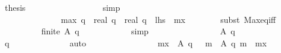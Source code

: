 \begin{isabellebody}
\ {\isacharquery}thesis\isanewline
\ \ \ \ \ \ \ \ \ \ \ \ \ \ \ \ \isamarkupfalse%
\ simp\isanewline
\ \ \ \ \ \ \ \ \ \ \ \ \isamarkupfalse%
\isanewline
\ \ \ \ \ \ \ \ \ \ \isamarkupfalse%
\isanewline
\ \ \ \ \ \ \ \ \isamarkupfalse%
\isanewline
\ \ \ \ \ \ \isamarkupfalse%
\isanewline
\isanewline
\ \ \ \ \ \ \isamarkupfalse%
\isanewline
\isanewline
\ \ \ \ \ \ \isamarkupfalse%
\ {\isachardoublequoteopen}{\isacharquery}max\ {\isacharparenleft}q{\isacharplus}{}{\isacharparenright}\ {\isacharequal}\ {\isacharparenleft}{\isacharparenleft}real\ q{\isacharparenright}{\isacharcircum}{}\ {\isacharminus}\ {}{\isacharparenright}{\isacharslash}{\isacharparenleft}real\ q{\isacharparenright}{\isacharcircum}{}{\isachardoublequoteclose}\ {\isacharparenleft}\ {\isachardoublequoteopen}{\isacharquery}lhs\ {\isacharequal}\ {\isacharquery}mx{\isachardoublequoteclose}{\isacharparenright}\isanewline
\ \ \ \ \ \ \isamarkupfalse%
\ {\isacharparenleft}subst\ Max{\isacharunderscore}eq{\isacharunderscore}iff{\isacharparenright}\isanewline
\ \ \ \ \ \ \ \ \isamarkupfalse%
\ {\isachardoublequoteopen}finite\ {\isacharparenleft}{\isacharquery}A\ {\isacharparenleft}q{\isacharplus}{}{\isacharparenright}{\isacharparenright}{\isachardoublequoteclose}\isanewline
\ \ \ \ \ \ \ \ \ \ \isamarkupfalse%
\ simp\isanewline
\ \ \ \ \ \ \isamarkupfalse%
\isanewline
\ \ \ \ \ \ \ \ \isamarkupfalse%
\ {\isachardoublequoteopen}{\isacharquery}A\ {\isacharparenleft}q{\isacharplus}{}{\isacharparenright}\ {\isasymnoteq}\ {\isacharbraceleft}{\isacharbraceright}{\isachardoublequoteclose}\isanewline
\ \ \ \ \ \ \ \ \ \ \isamarkupfalse%
\ {\isacharbackquoteopen}q\ {\isasymge}\ {}{\isacharbackquoteclose}\isanewline
\ \ \ \ \ \ \ \ \ \ \isamarkupfalse%
\ auto\isanewline
\ \ \ \ \ \ \isamarkupfalse%
\isanewline
\ \ \ \ \ \ \ \ \isamarkupfalse%
\ {\isachardoublequoteopen}{\isacharquery}mx\ {\isasymin}\ {\isacharquery}A\ {\isacharparenleft}q{\isacharplus}{}{\isacharparenright}\ {\isasymand}\ {\isacharparenleft}{\isasymforall}\ m{\isacharprime}\ {\isasymin}\ {\isacharquery}A\ {\isacharparenleft}q{\isacharplus}{}{\isacharparenright}{\isachardot}\ m{\isacharprime}\ {\isasymle}\ {\isacharquery}mx{\isacharparenright}{\isachardoublequoteclose}\isanewline

\end{isabellebody}

